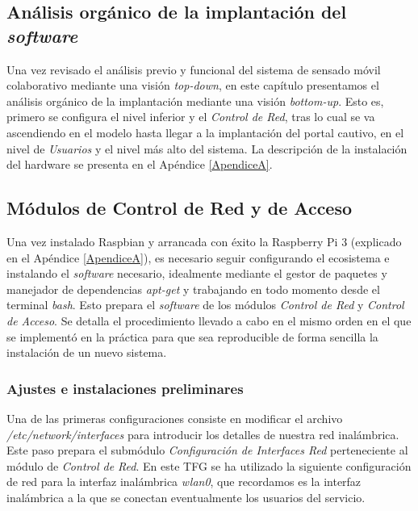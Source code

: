 \clearpage
{}
\begin{center}
\begin{minipage}{.75\textwidth}
\section{Análisis orgánico de la implantación del \emph{software}}

Una vez revisado el análisis previo y funcional del sistema de sensado móvil colaborativo mediante una visión \emph{top-down}, en este capítulo presentamos  el análisis orgánico de la implantación mediante una visión \emph{bottom-up}. Esto es, primero se configura el nivel inferior y el \emph{Control de Red}, tras lo cual se va ascendiendo en el modelo hasta llegar a la implantación del portal cautivo, en el nivel de \emph{Usuarios} y el nivel más alto del sistema. La descripción de la instalación del hardware se presenta en el Apéndice \ref{ApendiceA}.
\end{minipage}
\end{center}
\clearpage%

\subsection{Módulos de Control de Red y de Acceso}
Una vez instalado Raspbian y arrancada con éxito la Raspberry Pi 3 (explicado en el Apéndice \ref{ApendiceA}), es necesario seguir configurando el ecosistema e instalando el \emph{software} necesario, idealmente mediante el gestor de paquetes y manejador de dependencias \emph{apt-get} y trabajando en todo momento desde el terminal \emph{bash}. Esto prepara el \emph{software} de los módulos \emph{Control de Red} y \emph{Control de Acceso}. Se detalla el procedimiento llevado a cabo en el mismo orden en el que se implementó en la práctica para que sea reproducible de forma sencilla la instalación de un nuevo sistema.

\subsubsection{Ajustes e instalaciones preliminares}
Una de las primeras configuraciones consiste en modificar el archivo \emph{/etc/network/interfaces} para introducir los detalles de nuestra red inalámbrica. Este paso prepara el submódulo \emph{Configuración de Interfaces Red} perteneciente al módulo de \emph{Control de Red}. En este TFG se ha utilizado la siguiente configuración de red para la interfaz inalámbrica \emph{wlan0}, que recordamos es la interfaz inalámbrica a la que se conectan eventualmente los usuarios del servicio.


